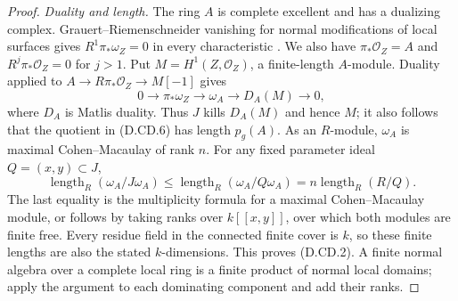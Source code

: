 \begin{proof}
\emph{Duality and length.}
The ring $A$ is complete excellent and has a dualizing complex.
Grauert--Riemenschneider vanishing for normal modifications of local
surfaces gives $R^1\pi_*\omega_Z=0$ in every characteristic
\citep[Tag 0AXD, Proposition 54.7.8, with the proof in Section 54.7]
{C_StacksCanonicalDefect}. We also have $\pi_*\mathcal O_Z=A$ and
$R^j\pi_*\mathcal O_Z=0$ for $j>1$. Put
$M=H^1(Z,\mathcal O_Z)$, a finite-length $A$-module. Duality applied to
$A\to R\pi_*\mathcal O_Z\to M[-1]$ gives
\[
 0\longrightarrow\pi_*\omega_Z\longrightarrow\omega_A
 \longrightarrow D_A(M)\longrightarrow0,               \tag{D.CD.6}
\]
where $D_A$ is Matlis duality. Thus $J$ kills $D_A(M)$ and hence $M$;
it also follows that the quotient in (D.CD.6) has length $p_g(A)$.
As an $R$-module, $\omega_A$ is maximal Cohen--Macaulay of rank $n$.
For any fixed parameter ideal $Q=(x,y)\subset J$,
\[
 \operatorname{length}_R(\omega_A/J\omega_A)
 \le\operatorname{length}_R(\omega_A/Q\omega_A)
 =n\operatorname{length}_R(R/Q).
\]
The last equality is the multiplicity formula for a maximal
Cohen--Macaulay module, or follows by taking ranks over $k[[x,y]]$,
over which both modules are finite free. Every residue field in the
connected finite cover is $k$, so these finite lengths are also the
stated $k$-dimensions. This proves (D.CD.2). A finite normal algebra over
a complete local ring is a finite product of normal local domains;
apply the argument to each dominating component and add their ranks.
\end{proof}

